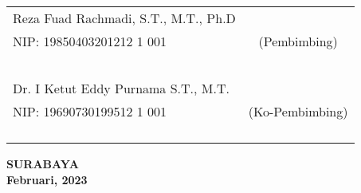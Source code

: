     \noindent
    \begin{tabularx}{\textwidth}{X c}
      Reza Fuad Rachmadi, S.T., M.T., Ph.D          &  \\
      NIP: 19850403201212 1 001      & (Pembimbing)\\
      &  \\
      &  \\
      &  \\
      &  \\
      &  \\
      Dr. I Ketut Eddy Purnama S.T., M.T.    &  \\
      NIP: 19690730199512 1 001        & (Ko-Pembimbing)\\
      &  \\
      &  \\
      &  \\
      &  \\
    \end{tabularx}
  \endgroup

  \vfill

  \begin{center}
    \textbf{SURABAYA} \\
    \textbf{Februari, 2023}
  \end{center}
\endgroup
